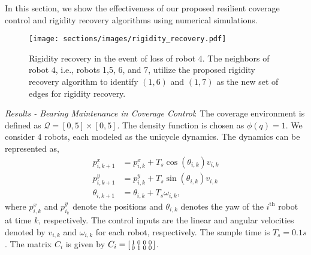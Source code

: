 In this section, we show the effectiveness of our proposed resilient coverage control and rigidity recovery algorithms using numerical simulations. %
\begin{figure*}[h]
\centering
        \centering
        \texttt{[image: sections/images/rigidity\_recovery.pdf]}
\caption{Rigidity recovery in the event of loss of robot $4$. The neighbors of robot $4$, i.e., robots 1,5, 6, and 7, utilize the proposed rigidity recovery algorithm to identify $(1,6)$ and $(1,7)$ as the new set of edges for rigidity recovery.}
\label{fig:rigidity_recovery}
\end{figure*}

\textit{Results - Bearing Maintenance in Coverage Control}: The coverage environment is defined as $\mathcal{Q} = [0,5] \times [0,5]$. The density function is chosen as $\phi(q) = 1$. We consider $4$ robots, each modeled as the unicycle dynamics. The dynamics can be represented as,
\begin{align}
    p^x_{i,k+1} &= p^x_{i,k} + T_s \cos (\theta_{i,k}) v_{i,k}\\
    p^y_{i,k+1} &= p^y_{i,k} + T_s \sin (\theta_{i,k}) v_{i,k}\\
    \theta_{i,k+1} &= \theta_{i,k} + T_s \omega_{i,k},
\end{align}
where $p_{i,k}^x$ and $p_{i_k}^y$ denote the positions and $\theta_{i,k}$ denotes the yaw of the $i^{\text{th}}$ robot at time $k$, respectively. The control inputs are the linear and angular velocities denoted by $v_{i,k}$ and $\omega_{i,k}$ for each robot, respectively. The sample time is $T_s = 0.1s$. The matrix $C_i$ is given by $
C_i = \begin{bsmallmatrix}
    1 & 0 & 0 & 0\\
    0 & 1 & 0 & 0
\end{bsmallmatrix}$. 

